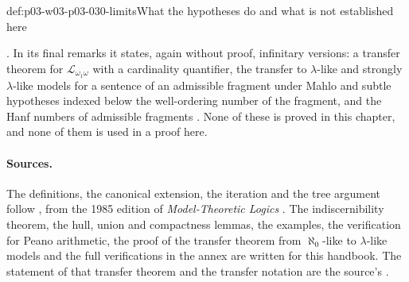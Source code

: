 \begin{hbwarning}{def:p03-w03-p03-030-limits}{What the hypotheses do and what is not established here}
\begin{enumerate}
  \cite[Theorems~6.1.2, 6.1.3, 6.1.5 and 6.1.6, pp.~204--206]{Schmerl1985TransferTheorems}.
  In its final remarks it states, again without proof, infinitary versions:
  a transfer theorem for \(\mathscr L_{\omega_1\omega}\) with a cardinality
  quantifier, the transfer to \(\lambda\)-like and strongly
  \(\lambda\)-like models for a sentence of an admissible fragment under
  Mahlo and subtle hypotheses indexed below the well-ordering number of the
  fragment, and the Hanf numbers of admissible fragments
  \cite[Theorems~7.2.1--7.2.3, p.~209]{Schmerl1985TransferTheorems}.  None of
  these is proved in this chapter, and none of them is used in a proof here.
\end{enumerate}
\end{hbwarning}

\paragraph{Sources.}  The definitions, the canonical extension, the
iteration and the tree argument follow
\cite[\S6, pp.~202--208]{Schmerl1985TransferTheorems}, from the 1985 edition
of \emph{Model-Theoretic Logics} \cite{BarwiseFeferman1985}.  The
indiscernibility theorem, the hull, union and compactness lemmas, the
examples, the verification for Peano arithmetic, the proof of the transfer
theorem from \(\aleph_0\)-like to \(\lambda\)-like models and the full
verifications in the annex are written for this handbook.  The statement of
that transfer theorem and the transfer notation are the source's
\cite[Definition~1.3.1, p.~180; Theorem~6.2.1, p.~206]{Schmerl1985TransferTheorems}.
